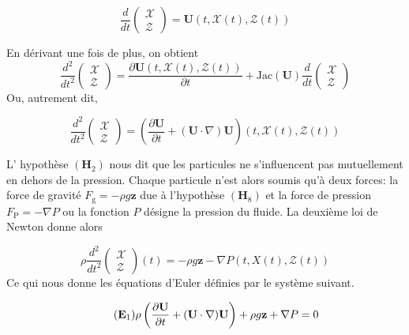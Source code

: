 \documentclass[12pt,a4paper]{article}
\numberwithin{equation}{section}
\begin{document}
\begin{equation}
\frac{d}{dt} \left(\begin{array}{l}
         \mathcal{X}\\
         \mathcal{Z}
\end{array}\right) = \textbf{U}(t,\mathcal{X}(t), \mathcal{Z}(t)) 
\end{equation}

En dérivant une fois de plus, on obtient 
$$
\frac{d^2 }{dt^2}\left(\begin{array}{l}
         \mathcal{X}\\
         \mathcal{Z}
\end{array}\right)  = \frac{\partial \textbf{U}(t,\mathcal{X}(t),\mathcal{Z}(t))}{\partial t} + \text{Jac}(\textbf{U})\frac{d}{d t}\left(\begin{array}{l}
         \mathcal{X}\\
         \mathcal{Z}
\end{array}\right) 
$$
    Ou, autrement dit,
    
$$
\frac{d^2 }{dt^2}\left(\begin{array}{l}
         \mathcal{X}\\
         \mathcal{Z}
\end{array}\right)= \left(\frac{\partial\textbf{U}}{\partial t}+ (\textbf{U}\cdot \nabla ) \textbf{U}\right)(t,\mathcal{X}(t),\mathcal{Z}(t)) 
$$

L' hypothèse $(\textbf{H}_2)$ nous dit que les particules ne s'influencent pas mutuellement en dehors de la pression. Chaque particule n'est alors soumis qu'à deux forces: la force de gravité $ F_\text{g} = -\rho g\textbf{z}$ due à l'hypothèse $(\textbf{H}_8)$ et la force de pression $F_\text{P} = - \nabla P$ ou la fonction $P$ désigne la pression du fluide. La deuxième loi de Newton donne alors

$$
\rho\frac{d^2 }{dt^2}\left(\begin{array}{l}
         \mathcal{X}\\
         \mathcal{Z}
\end{array}\right)(t) = - \rho g \textbf{z} -\nabla P(t,X(t),\mathcal{Z}(t))
$$
Ce qui nous donne les équations d'Euler définies par le système suivant.

\begin{equation} 
\tag{$\textbf{E}_1$} \label{eq_E1}
\rho \left( \frac{\partial \textbf{U}}{\partial t} + (\textbf{U}\cdot \nabla ) \textbf{U} \right) + \rho g\textbf{z} + \nabla P = 0
\end{equation}
\end{document}
